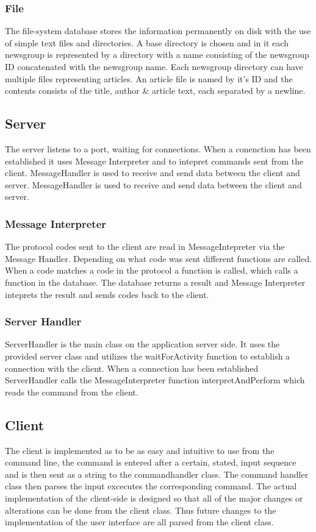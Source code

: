 \documentclass[a4paper, titlepage]{article}
\begin{document}
\subsubsection{File}
The file-system database stores the information permanently on disk with the use of simple text files and directories. A base directory is chosen and in it each newsgroup is represented by a directory with a name consisting of the newsgroup ID concatenated with the newsgroup name. Each newsgroup directory can have multiple files representing articles. An article file is named by it's ID and the contents consists of the title, author \& article text, each separated by a newline.

\subsection{Server}
 The server listens to a port, waiting for connections. When a conenction has been established it uses Message Interpreter and to intepret commands sent from the client. MessageHandler is used to receive and send data between the client and server. MessageHandler is used to receive and send data between the client and server.   

\subsubsection{Message Interpreter}
The protocol codes sent to the client are read in MessageIntepreter via the Message Handler. Depending on what code was sent different functions are called. When a code matches a code in the protocol a function is called, which calls a function in the database. The database returns a result and Message Interpreter inteprets the result and sends codes back to the client.

\subsubsection{Server Handler}
ServerHandler is the main class on the application server side. It uses the provided server class and utilizes the waitForActivity function to establish a connection with the client. When a connection has been established ServerHandler calls the MessageInterpreter function interpretAndPerform which reads the command from the client.

\subsection{Client}
The client is implemented as to be as easy and intuitive to use from the command line, the command is entered after a certain, stated, input sequence and is then sent as a string to the commandhandler class. The command handler class then parses the input excecutes the corresponding command. The actual implementation of the client-side is designed so that all of the major changes or alterations can be done from the client class. Thus future changes to the implementation of the user interface are all parsed from the client class.
\end{document}
